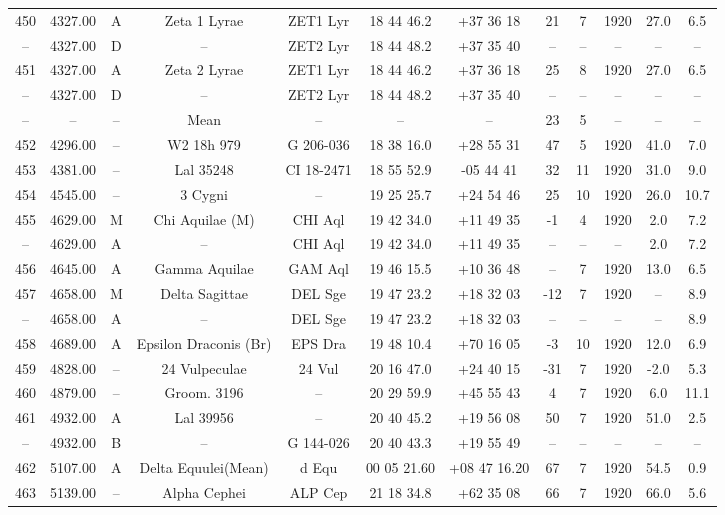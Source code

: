 \begin{table}
\begin{tabular}{cccccccccccc}
450 & 4327.00 & A & Zeta 1 Lyrae & ZET1 Lyr & 18 44 46.2 & +37 36 18 & 21 & 7 & 1920 & 27.0 & 6.5 \\
-- & 4327.00 & D & -- & ZET2 Lyr & 18 44 48.2 & +37 35 40 & -- & -- & -- & -- & -- \\
451 & 4327.00 & A & Zeta 2 Lyrae & ZET1 Lyr & 18 44 46.2 & +37 36 18 & 25 & 8 & 1920 & 27.0 & 6.5 \\
-- & 4327.00 & D & -- & ZET2 Lyr & 18 44 48.2 & +37 35 40 & -- & -- & -- & -- & -- \\
-- & -- & -- & Mean & -- & -- & -- & 23 & 5 & -- & -- & -- \\
452 & 4296.00 & -- & W2 18h 979 & G 206-036 & 18 38 16.0 & +28 55 31 & 47 & 5 & 1920 & 41.0 & 7.0 \\
453 & 4381.00 & -- & Lal 35248 & CI 18-2471 & 18 55 52.9 & -05 44 41 & 32 & 11 & 1920 & 31.0 & 9.0 \\
454 & 4545.00 & -- & 3 Cygni & -- & 19 25 25.7 & +24 54 46 & 25 & 10 & 1920 & 26.0 & 10.7 \\
455 & 4629.00 & M & Chi Aquilae (M) & CHI Aql & 19 42 34.0 & +11 49 35 & -1 & 4 & 1920 & 2.0 & 7.2 \\
-- & 4629.00 & A & -- & CHI Aql & 19 42 34.0 & +11 49 35 & -- & -- & -- & 2.0 & 7.2 \\
456 & 4645.00 & A & Gamma Aquilae & GAM Aql & 19 46 15.5 & +10 36 48 & -- & 7 & 1920 & 13.0 & 6.5 \\
457 & 4658.00 & M & Delta Sagittae & DEL Sge & 19 47 23.2 & +18 32 03 & -12 & 7 & 1920 & -- & 8.9 \\
-- & 4658.00 & A & -- & DEL Sge & 19 47 23.2 & +18 32 03 & -- & -- & -- & -- & 8.9 \\
458 & 4689.00 & A & Epsilon Draconis (Br) & EPS Dra & 19 48 10.4 & +70 16 05 & -3 & 10 & 1920 & 12.0 & 6.9 \\
459 & 4828.00 & -- & 24 Vulpeculae & 24 Vul & 20 16 47.0 & +24 40 15 & -31 & 7 & 1920 & -2.0 & 5.3 \\
460 & 4879.00 & -- & Groom. 3196 & -- & 20 29 59.9 & +45 55 43 & 4 & 7 & 1920 & 6.0 & 11.1 \\
461 & 4932.00 & A & Lal 39956 & -- & 20 40 45.2 & +19 56 08 & 50 & 7 & 1920 & 51.0 & 2.5 \\
-- & 4932.00 & B & -- & G 144-026 & 20 40 43.3 & +19 55 49 & -- & -- & -- & -- & -- \\
462 & 5107.00 & A & Delta Equulei(Mean) & d Equ & 00 05 21.60 & +08 47 16.20 & 67 & 7 & 1920 & 54.5 & 0.9 \\
463 & 5139.00 & -- & Alpha Cephei & ALP Cep & 21 18 34.8 & +62 35 08 & 66 & 7 & 1920 & 66.0 & 5.6 \\

\end{tabular}
\end{table}
